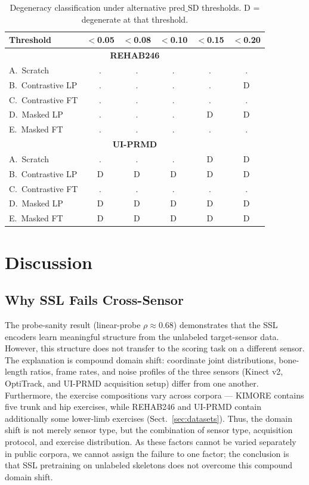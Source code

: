 \documentclass[10pt,journal]{IEEEtran}
\begin{document}
\begin{table}[t]
\centering
\caption{Degeneracy classification under alternative $\text{pred\_SD}$ thresholds. D = degenerate at that threshold.}
\label{tab:deg-sensitivity}
\small
\begin{tabular}{@{}lccccc@{}}
\toprule
Threshold & $<$0.05 & $<$0.08 & $<$0.10 & $<$0.15 & $<$0.20 \\
\midrule
\multicolumn{6}{c}{\textbf{REHAB246}} \\
A.\ Scratch         & . & . & . & . & . \\
B.\ Contrastive LP  & . & . & . & . & D \\
C.\ Contrastive FT  & . & . & . & . & . \\
D.\ Masked LP       & . & . & . & D & D \\
E.\ Masked FT       & . & . & . & . & . \\
\midrule
\multicolumn{6}{c}{\textbf{UI-PRMD}} \\
A.\ Scratch         & . & . & . & D & D \\
B.\ Contrastive LP  & D & D & D & D & D \\
C.\ Contrastive FT  & . & . & . & . & . \\
D.\ Masked LP       & D & D & D & D & D \\
E.\ Masked FT       & D & D & D & D & D \\
\bottomrule
\end{tabular}
\end{table}

\section{Discussion}
\label{sec:discussion}

\subsection{Why SSL Fails Cross-Sensor}
\label{sec:why-fails}

The probe-sanity result (linear-probe $\rho \approx 0.68$) demonstrates that the SSL encoders learn meaningful structure from the unlabeled target-sensor data. However, this structure does not transfer to the scoring task on a different sensor. The explanation is compound domain shift: coordinate joint distributions, bone-length ratios, frame rates, and noise profiles of the three sensors (Kinect v2, OptiTrack, and UI-PRMD acquisition setup) differ from one another. Furthermore, the exercise compositions vary across corpora --- KIMORE contains five trunk and hip exercises, while REHAB246 and UI-PRMD contain additionally some lower-limb exercises (Sect.~\ref{sec:datasets}). Thus, the domain shift is not merely sensor type, but the combination of sensor type, acquisition protocol, and exercise distribution. As these factors cannot be varied separately in public corpora, we cannot assign the failure to one factor; the conclusion is that SSL pretraining on unlabeled skeletons does not overcome this compound domain shift.
\end{document}

